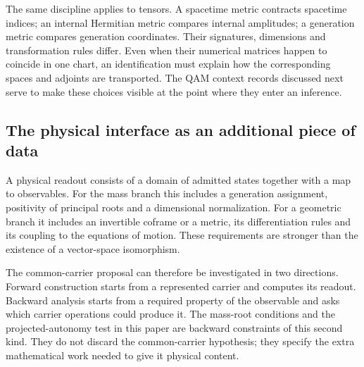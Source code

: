The same discipline applies to tensors. A spacetime metric contracts
spacetime indices; an internal Hermitian metric compares internal
amplitudes; a generation metric compares generation coordinates.
Their signatures, dimensions and transformation rules differ. Even
when their numerical matrices happen to coincide in one chart, an
identification must explain how the corresponding spaces and adjoints
are transported. The QAM context records discussed next serve to make
these choices visible at the point where they enter an inference.

\subsection{The physical interface as an additional piece of data}
A physical readout consists of a domain of admitted states together
with a map to observables. For the mass branch this includes a
generation assignment, positivity of principal roots and a dimensional
normalization. For a geometric branch it includes an invertible
coframe or a metric, its differentiation rules and its coupling to
the equations of motion. These requirements are stronger than the
existence of a vector-space isomorphism.

The common-carrier proposal can therefore be investigated in two
directions. Forward construction starts from a represented carrier
and computes its readout. Backward analysis starts from a required
property of the observable and asks which carrier operations could
produce it. The mass-root conditions and the projected-autonomy test
in this paper are backward constraints of this second kind. They do
not discard the common-carrier hypothesis; they specify the extra
mathematical work needed to give it physical content.
